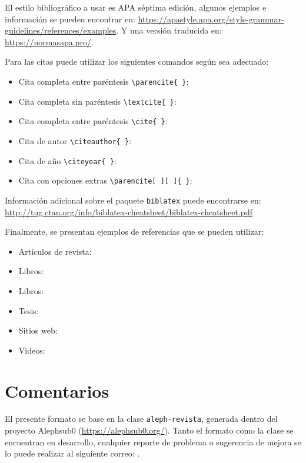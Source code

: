 \documentclass{aleph-revista}
\begin{document}
El estilo bibliográfico a usar es APA séptima edición, algunos ejemplos e información se pueden encontrar en: \url{https://apastyle.apa.org/style-grammar-guidelines/references/examples}. Y una versión traducida en: \url{https://normasapa.pro/}.

Para las citas puede utilizar los siguientes comandos según sea adecuado:
\begin{itemize}
\item 
    Cita completa entre paréntesis \verb"\parencite{ }": \parencite{Bib06}
\item
    Cita completa sin paréntesis \verb"\textcite{ }": \textcite{Bib06}
\item 
    Cita completa entre paréntesis \verb"\cite{ }": \cite{Bib06}
\item
    Cita de autor \verb"\citeauthor{ }": \citeauthor{Bib06}
\item
    Cita de año \verb"\citeyear{ }": \citeyear{Bib06}
\item 
    Cita con opciones extras \verb"\parencite[ ][ ]{ }": \parencite[ver][pág. 66]{Bib06}
\end{itemize}
Información adicional sobre el paquete \texttt{biblatex} puede encontrarse en: \url{http://tug.ctan.org/info/biblatex-cheatsheet/biblatex-cheatsheet.pdf}

Finalmente, se presentan ejemplos de referencias que se pueden utilizar:
\begin{itemize}
    \item Artículos de revista: \cite{Bib01}
    \item Libros: \cite{Bib02}
    \item Libros: \cite{Bib06}
    \item Tesis: \cite{Bib03}
    \item Sitios web: \cite{Bib04}
    \item Videos: \cite{Bib05}
\end{itemize}

\section{Comentarios}

El presente formato se base en la clase \texttt{aleph-revista}, generada dentro del proyecto Alephsub0 (\url{https://alephsub0.org/}). Tanto el formato como la clase se encuentran en desarrollo, cualquier reporte de problema o sugerencia de mejora se lo puede realizar al siguiente correo: 
.


\printbibliography
\end{document}
